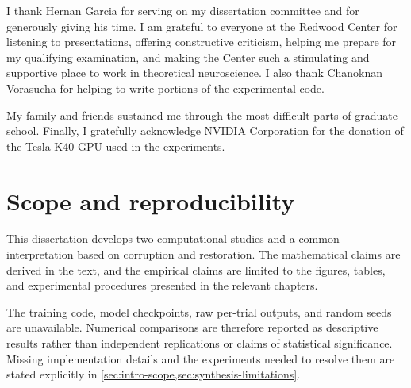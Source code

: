 \documentclass[11pt,oneside,openany]{book}
\begin{document}
I thank Hernan Garcia for serving on my dissertation committee and for generously giving his time. I am grateful to everyone at the Redwood Center for listening to presentations, offering constructive criticism, helping me prepare for my qualifying examination, and making the Center such a stimulating and supportive place to work in theoretical neuroscience. I also thank Chanoknan Vorasucha for helping to write portions of the experimental code.

My family and friends sustained me through the most difficult parts of graduate school. Finally, I gratefully acknowledge NVIDIA Corporation for the donation of the Tesla K40 GPU used in the experiments.

\chapter*{Scope and reproducibility}
This dissertation develops two computational studies and a common interpretation based on corruption and restoration. The mathematical claims are derived in the text, and the empirical claims are limited to the figures, tables, and experimental procedures presented in the relevant chapters.

The training code, model checkpoints, raw per-trial outputs, and random seeds are unavailable. Numerical comparisons are therefore reported as descriptive results rather than independent replications or claims of statistical significance. Missing implementation details and the experiments needed to resolve them are stated explicitly in \cref{sec:intro-scope,sec:synthesis-limitations}.

\mainmatter






\appendix


\backmatter
\printbibliography
\end{document}
